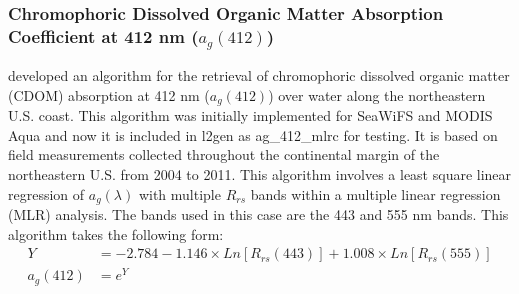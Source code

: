 \documentclass[onecolumn,3p,letterpaper,11pt]{elsarticle}
\begin{document}
\subsubsection{Chromophoric Dissolved Organic Matter Absorption Coefficient at 412 nm ($a_g(412)$)}
\citet{Mannino2014} developed an algorithm for the retrieval of chromophoric dissolved organic matter (CDOM) absorption at 412 nm ($a_g(412)$) over water along the northeastern U.S. coast. This algorithm was initially implemented for SeaWiFS and MODIS Aqua and now it is included in l2gen as {\ttfamily ag\_412\_mlrc} for testing. It is based on field measurements collected throughout the continental margin of the northeastern U.S. from 2004 to 2011. This algorithm involves a least square linear regression of $a_g(\lambda)$ with multiple $R_{rs}$ bands within a multiple linear regression (MLR) analysis. The bands used in this case are the 443 and 555 nm bands. This algorithm takes the following form:
\begin{equation}
\begin{split}
  Y &= -2.784 -1.146\times Ln[R_{rs}(443)] + 1.008\times Ln[R_{rs}(555)] \\
  a_g(412) &= e^Y
\end{split}
\end{equation}

\end{document}
